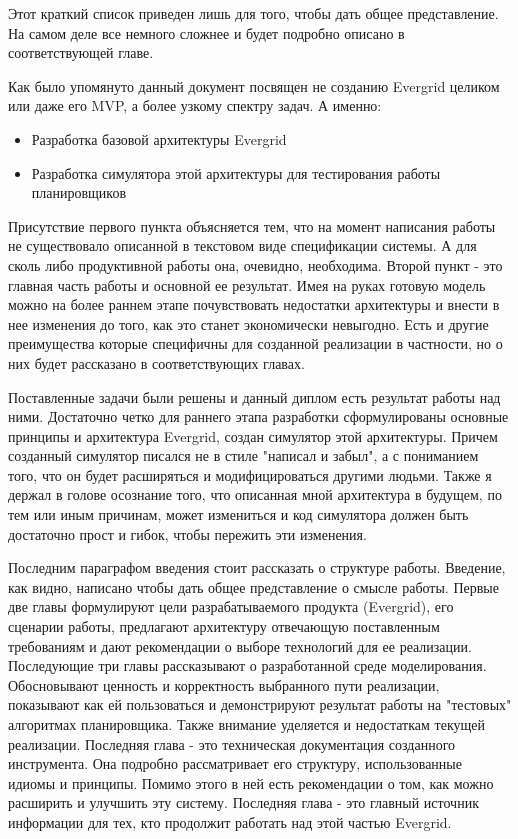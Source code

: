 Этот краткий список приведен лишь для того, чтобы дать общее представление. На самом деле все немного сложнее и будет подробно описано в соответствующей главе.

Как было упомянуто данный документ посвящен не созданию Evergrid целиком или даже его MVP, а более узкому спектру задач. А именно:

\begin{itemize}
	\item Разработка базовой архитектуры Evergrid
	\item Разработка симулятора этой архитектуры для тестирования работы планировщиков
\end{itemize}

Присутствие первого пункта объясняется тем, что на момент написания работы не существовало описанной в текстовом виде спецификации системы. А для сколь либо продуктивной работы она, очевидно, необходима. Второй пункт - это главная часть работы и основной ее результат. Имея на руках готовую модель можно на более раннем этапе почувствовать недостатки архитектуры и внести в нее изменения до того, как это станет экономически невыгодно. Есть и другие преимущества которые специфичны для созданной реализации в частности, но о них будет рассказано в соответствующих главах.

Поставленные задачи были решены и данный диплом есть результат работы над ними. Достаточно четко для раннего этапа разработки сформулированы основные принципы и архитектура Evergrid, создан симулятор этой архитектуры. Причем созданный симулятор писался не в стиле "написал и забыл", а с пониманием того, что он будет расширяться и модифицироваться другими людьми. Также я держал в голове осознание того, что описанная мной архитектура в будущем, по тем или иным причинам, может измениться и код симулятора должен быть достаточно прост и гибок, чтобы пережить эти изменения.

Последним параграфом введения стоит рассказать о структуре работы. Введение, как видно, написано чтобы дать общее представление о смысле работы. Первые две главы формулируют цели разрабатываемого продукта (Evergrid), его сценарии работы, предлагают архитектуру отвечающую поставленным требованиям и дают рекомендации о выборе технологий для ее реализации. Последующие три главы рассказывают о разработанной среде моделирования. Обосновывают ценность и корректность выбранного пути реализации, показывают как ей пользоваться и демонстрируют результат работы на "тестовых" алгоритмах планировщика. Также внимание уделяется и недостаткам текущей реализации. Последняя глава - это техническая документация созданного инструмента. Она подробно рассматривает его структуру, использованные идиомы и принципы. Помимо этого в ней есть рекомендации о том, как можно расширить и улучшить эту систему. Последняя глава - это главный источник информации для тех, кто продолжит работать над этой частью Evergrid.